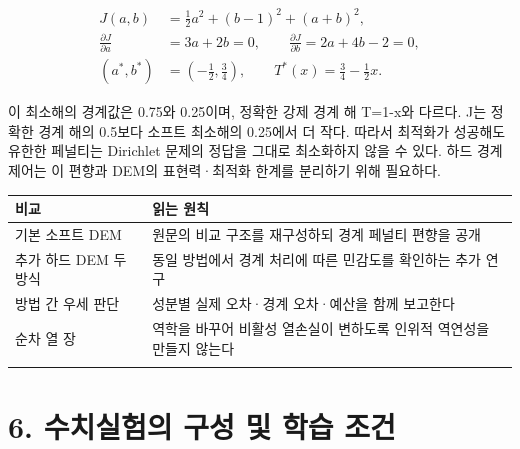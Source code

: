 \documentclass[10pt,a4paper]{article}
\begin{document}
\begin{equation}\begin{aligned}J(a,b)&=\tfrac12a^2+(b-1)^2+(a+b)^2,\\\frac{\partial J}{\partial a}&=3a+2b=0,\qquad \frac{\partial J}{\partial b}=2a+4b-2=0,\\(a^*,b^*)&=\left(-\tfrac12,\tfrac34\right),\qquad T^*(x)=\tfrac34-\tfrac12x.\end{aligned}\end{equation}

이 최소해의 경계값은 0.75와 0.25이며, 정확한 강제 경계 해 T=1-x와 다르다. J는 정확한 경계 해의 0.5보다 소프트 최소해의 0.25에서 더 작다. 따라서 최적화가 성공해도 유한한 페널티는 Dirichlet 문제의 정답을 그대로 최소화하지 않을 수 있다. 하드 경계 제어는 이 편향과 DEM의 표현력·최적화 한계를 분리하기 위해 필요하다.\par

\begingroup\small

\par\begin{minipage}{\linewidth}\begin{tabular}{>{\raggedright\arraybackslash}p{}>{\raggedright\arraybackslash}p{}}

\rowcolor{tint} \textbf{비교} & \textbf{읽는 원칙}\\\midrule

기본 소프트 DEM & 원문의 비교 구조를 재구성하되 경계 페널티 편향을 공개\\\addlinespace[2pt]

추가 하드 DEM 두 방식 & 동일 방법에서 경계 처리에 따른 민감도를 확인하는 추가 연구\\\addlinespace[2pt]

방법 간 우세 판단 & 성분별 실제 오차·경계 오차·예산을 함께 보고한다\\\addlinespace[2pt]

순차 열 장 & 역학을 바꾸어 비활성 열손실이 변하도록 인위적 역연성을 만들지 않는다\\\addlinespace[2pt]

\bottomrule\end{tabular}\end{minipage}\par\vspace{5pt}\endgroup

\clearpage

\section{6. 수치실험의 구성 및 학습 조건}
\end{document}
